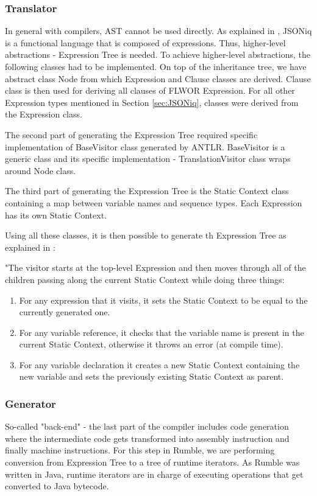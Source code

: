 \subsubsection{Translator}
In general with compilers, AST cannot be used directly. As explained in \cite{RumbleMLThesis}, JSONiq is a functional language that is composed of expressions. Thus, higher-level abstractions - Expression Tree is needed. To achieve higher-level abstractions, the following classes had to be implemented. On top of the inheritance tree, we have abstract class Node from which Expression and Clause classes are derived. Clause class is then used for deriving all clauses of FLWOR Expression. For all other Expression types mentioned in Section \ref{sec:JSONiq}, classes were derived from the Expression class. 

The second part of generating the Expression Tree required specific implementation of BaseVisitor class generated by ANTLR. BaseVisitor is a generic class and its specific implementation - TranslationVisitor class wraps around Node class. 

The third part of generating the Expression Tree is the Static Context class containing a map between variable names and sequence types. Each Expression has its own Static Context.

Using all these classes, it is then possible to generate th Expression Tree as explained in \cite{RumbleThesis}: 

"The visitor starts at the top-level Expression and then moves through all of the children passing along the current Static Context while doing three things:
\begin{enumerate}
	\item For any expression that it visits, it sets the Static Context to be equal to the currently generated one.
	\item For any variable reference, it checks that the variable name is present in the current Static Context, otherwise it throws an error (at compile time).
	\item For any variable declaration it creates a new Static Context containing the new variable and sets the previously existing Static Context as parent.
\end{enumerate}

\subsubsection{Generator}
\label{sec:Generator}
So-called "back-end" - the last part of the compiler includes code generation where the intermediate code gets transformed into assembly instruction and finally machine instructions. For this step in Rumble, we are performing conversion from Expression Tree to a tree of runtime iterators. As Rumble was written in Java, runtime iterators are in charge of executing operations that get converted to Java bytecode.

